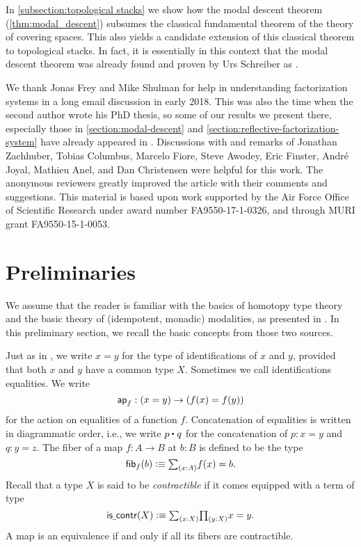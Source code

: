 \documentclass[9pt,twosided]{amsart}
\begin{document}
In \cref{subsection:topological stacks} we show how the modal descent theorem (\cref{thm:modal_descent})
subsumes the classical fundamental theorem of the theory of covering spaces.
This also yields a candidate extension of this classical theorem to topological stacks.
In fact, it is essentially in this context that the modal descent theorem was already found and proven by Urs Schreiber as \cite[Proposition 5.2.42]{SchreiberDcct}.
  
We thank Jonas Frey and Mike Shulman for help in understanding factorization systems in a long email discussion in early 2018. This was also the time when the second author wrote his PhD thesis, so some of our results we present there, especially those in \cref{section:modal-descent} and \cref{section:reflective-factorization-system} have already appeared in \cite{rijke-phd}.
Discussions with and remarks of Jonathan Zachhuber, Tobias Columbus, Marcelo Fiore, Steve Awodey, Eric Finster, André Joyal, Mathieu Anel, and Dan Christensen were helpful for this work.
The anonymous reviewers greatly improved the article with their comments and suggestions. 
This material is based upon work supported by the Air Force Office of Scientific Research under award number FA9550-17-1-0326, and through MURI grant FA9550-15-1-0053.


\section{Preliminaries}
We assume that the reader is familiar with the basics of homotopy type theory \cite{UFP} and the basic theory of (idempotent, monadic) modalities, as presented in \cite{RijkeSpittersShulman}. In this preliminary section, we recall the basic concepts from those two sources.

Just as in \cite{UFP}, we write $x=y$ for the type of identifications of $x$ and $y$, provided that both $x$ and $y$ have a common type $X$. Sometimes we call identifications equalities. We write
\begin{equation*}
  \mathsf{ap}_{f}:(x=y)\to (f(x)=f(y))
\end{equation*}
for the action on equalities of a function $f$. Concatenation of equalities is written in diagrammatic order, i.e., we write $\ct{p}{q}$ for the concatenation of $p:x=y$ and $q:y=z$. The fiber of a map $f:A\to B$ at $b:B$ is defined to be the type
\begin{equation*}
  \fib{f}{b}\defeq \sm{x:A}f(x)=b.
\end{equation*}
Recall that a type $X$ is said to be \emph{contractible} if it comes equipped with a term of type
\begin{equation*}
  \iscontr(X)\defeq \sm{x:X}\prd{y:X}x=y.
\end{equation*}
A map is an equivalence if and only if all its fibers are contractible.
\end{document}

